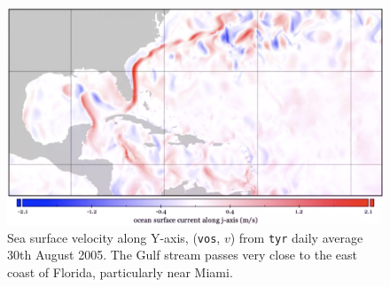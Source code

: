 
\begin{figure}
\includegraphics[width=0.93\linewidth]{images/example-images/vos.png}
\caption{Sea surface velocity along Y-axis, (\texttt{vos}, $v$) from \texttt{tyr} daily average 30th August 2005.
         The Gulf stream passes very close to the east coast of Florida, particularly near Miami.}
\label{fig:vos}
\end{figure}
